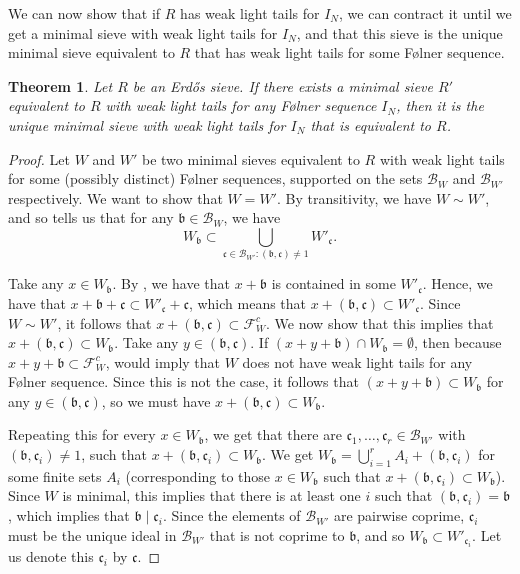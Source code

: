 \documentclass[a4paper,11pt,reqno]{amsart}
\theoremstyle{plain}
\newtheorem{theorem}{Theorem}[section]
\theoremstyle{remark}
\newcommand{\cb}{\mathcal{B}}
\newcommand{\cf}{\mathcal{F}}
\newcommand{\gb}{\mathfrak{b}}
\newcommand{\gc}{\mathfrak{c}}
\begin{document}
		We can now show that if $R$ has weak light tails for $I_N$, we can contract it until we get a minimal sieve with weak light tails for $I_N$, and that this sieve is the unique minimal sieve equivalent to $R$ that has weak light tails for some Følner sequence.
		
		\begin{theorem}
			\label{thm: uniqueness of minimal sieve}
			Let $R$ be an Erdős sieve. If there exists a minimal sieve $R'$  equivalent to $R$ with weak light tails for any Følner sequence $I_N$, then it is the unique minimal sieve with weak light tails for $I_N$ that is equivalent to $R$.
		\end{theorem}
		
		\begin{proof}
			
			
			Let $W$ and $W'$ be two minimal sieves equivalent to $R$ with weak light tails for some (possibly distinct) Følner sequences, supported on the sets $\cb_W$ and $\cb_{W'}$ respectively. We want to show that $W = W'$. By transitivity, we have $W \sim W'$, and so   tells us that for any $\gb \in \cb_W$, we have $$W_\gb \subset \bigcup_{\gc \in\cb_{W'}: (\gb,\gc) \neq 1 } W'_\gc. $$
			
			Take any $x \in W_\gb$.  By ,  we have that $x+\gb$ is contained in some $W'_\gc$. Hence, we have that $x+\gb + \gc \subset W'_\gc +\gc$, which means that $x+(\gb,\gc) \subset W'_\gc$. Since $W \sim W'$, it follows that $x+(\gb,\gc) \subset \cf_W^c$. We now show that this implies that $x+(\gb,\gc) \subset W_\gb$. Take any $y \in(\gb,\gc) $. If $(x+y+\gb)\cap W_\gb = \emptyset$, then because $x+y+\gb \subset \cf_W^c$,   would imply that $W$ does not have weak light tails for any Følner sequence. Since this is not the case, it follows that $(x+y+\gb) \subset W_\gb$ for any $y \in(\gb,\gc)$, so we must have $x+(\gb,\gc) \subset W_\gb$.
		
			
			Repeating this for every $x \in W_\gb$, we get that there are $\gc_1, \dots, \gc_r \in \cb_{W'}$ with $(\gb,\gc_i) \neq 1$, such that $x+(\gb,\gc_i) \subset W_\gb$. We get $W_\gb = \bigcup_{i=1}^r A_i + (\gb,\gc_i)$ for some finite sets $A_i$ (corresponding to those $x \in W_\gb$ such that $x+ (\gb,\gc_i) \subset W_\gb$). Since $W$ is minimal, this implies that there is at least one $i$ such that $(\gb,\gc_i) = \gb$, which implies that $\gb \mid \gc_i $. Since the elements of $\cb_{W'}$ are pairwise coprime,  $\gc_i$ must be the unique ideal in $\cb_{W'}$ that is not coprime to $\gb$, and so $W_\gb \subset W'_{\gc_i}$. Let us denote this $\gc_i$ by $\gc$.
			

\end{proof}
\end{document}

